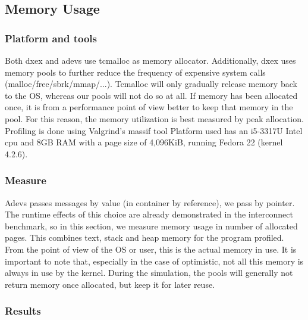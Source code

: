 \subsection{Memory Usage}
\subsubsection{Platform and tools}
Both dxex and adevs use tcmalloc as memory allocator. Additionally, dxex uses memory pools to further reduce the frequency of expensive system calls (malloc/free/sbrk/mmap/...). Tcmalloc will only gradually release memory back to the OS, whereas our pools will not do so at all. If memory has been allocated once, it is from a performance point of view better to keep that memory in the pool. For this reason, the memory utilization is best measured by peak allocation. Profiling is done using Valgrind's massif tool \cite{Nethercote:2007:VFH:1273442.1250746}
Platform used has an i5-3317U Intel cpu and 8GB RAM with a page size of 4,096KiB, running Fedora 22 (kernel 4.2.6).\\
\subsubsection{Measure}
Adevs passes messages by value (in container by reference), we pass by pointer. The runtime effects of this choice are already demonstrated in the interconnect benchmark, so in this section, we measure memory usage in number of allocated pages. This combines text, stack and heap memory for the program profiled. From the point of view of the OS or user, this is the actual memory in use. It is important to note that, especially in the case of optimistic, not all this memory is always in use by the kernel. During the simulation, the pools will generally not return memory once allocated, but keep it for later reuse.
\subsubsection{Results}
